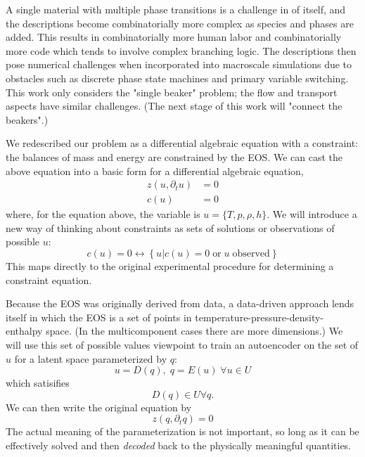 \documentclass[]{article}
\begin{document}
A single material with multiple phase transitions
is a challenge in of itself, and the descriptions become combinatorially
more complex as species and phases are added. This results in
combinatorially more human labor and combinatorially more code which
tends to involve complex branching logic. The descriptions then pose
numerical challenges when incorporated into macroscale simulations due
to obstacles such as discrete phase state machines and primary variable
switching.
This work only considers the "single beaker" problem; the flow
and transport aspects have similar challenges. (The next stage of this
work will "connect the beakers".)


We redescribed our problem as a differential algebraic equation
with a constraint: the balances of mass and energy are constrained by
the EOS. We can cast the above equation into a basic form for a
differential algebraic equation,
\begin{align}
  z( u, \partial_t u) &= 0 \\
  c(u) & = 0
\end{align}
where, for the equation above, the variable is $u=\{T,p,\rho,h\}$. We will introduce a new way of thinking about constraints as sets of
solutions or observations of possible $u$:
\begin{equation}
c(u)=0 \longleftrightarrow \left\{ u | c(u)=0 \;\text{or}\; u\; \text{observed} \right\}
\end{equation}
This maps directly to the original experimental procedure for
determining a constraint equation.

Because the EOS was originally derived from data, a data-driven
approach lends itself in which the EOS is a set of points in
temperature-pressure-density-enthalpy space. (In the multicomponent
cases there are more dimensions.)
We will use this set of possible values viewpoint to train an
autoencoder on the set of $u$ for a latent space parameterized by $q$:
\begin{equation}
u = D(q), \; q=E(u) \;\forall u \in U
\end{equation}
which satisifies
\begin{equation}
  D(q)\in U \forall q.
\end{equation}
We can then write the original equation by
\begin{equation}
z(q,\partial_t q)=0
\end{equation}
The actual meaning of the parameterization is not important, so long as
it can be effectively solved and then \emph{decoded} back to the
physically meaningful quantities.
\end{document}

